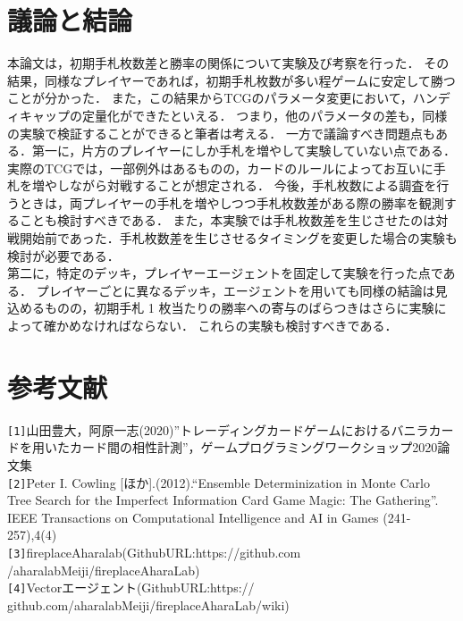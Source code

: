 \documentclass[twocolumn]{ltjsarticle}
\begin{document}
\section{議論と結論}
\small{
  本論文は，初期手札枚数差と勝率の関係について実験及び考察を行った．
  その結果，同様なプレイヤーであれば，初期手札枚数が多い程ゲームに安定して勝つことが分かった．
  また，この結果からTCGのパラメータ変更において，ハンディキャップの定量化ができたといえる．
  つまり，他のパラメータの差も，同様の実験で検証することができると筆者は考える．
  一方で議論すべき問題点もある．第一に，片方のプレイヤーにしか手札を増やして実験していない点である．
  実際のTCGでは，一部例外はあるものの，カードのルールによってお互いに手札を増やしながら対戦することが想定される．
  今後，手札枚数による調査を行うときは，両プレイヤーの手札を増やしつつ手札枚数差がある際の勝率を観測することも検討すべきである．
  また，本実験では手札枚数差を生じさせたのは対戦開始前であった．手札枚数差を生じさせるタイミングを変更した場合の実験も検討が必要である．
  \\第二に，特定のデッキ，プレイヤーエージェントを固定して実験を行った点である．
  プレイヤーごとに異なるデッキ，エージェントを用いても同様の結論は見込めるものの，初期手札 1 枚当たりの勝率への寄与のばらつきはさらに実験によって確かめなければならない．
  これらの実験も検討すべきである．
}
\section{
  参考文献
}
\small{
  \verb#[1]#山田豊大，阿原一志(2020)”トレーディングカードゲームにおけるバニラカードを用いたカード間の相性計測”，ゲームプログラミングワークショップ2020論文集
  \\
  \verb#[2]#Peter I. Cowling [ほか].(2012).“Ensemble
  Determinization in Monte Carlo Tree Search for the
  Imperfect Information Card Game Magic: The Gathering”.
  IEEE Transactions on Computational Intelligence and AI
  in Games (241-257),4(4)
  \\
  \verb#[3]#fireplaceAharalab(GithubURL:https://github.com
  /aharalabMeiji/fireplaceAharaLab)
  \\
  \verb#[4]#Vectorエージェント(GithubURL:https://
  github.com/aharalabMeiji/fireplaceAharaLab/wiki)
  

  
}

\end{document}

